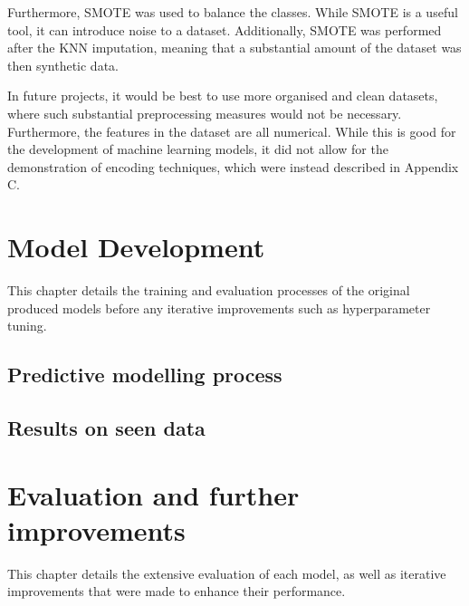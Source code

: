 \documentclass[12pt]{report}
\newcommand{\para}{\vspace{8pt}\noindent}
\begin{document}
\para Furthermore, SMOTE was used to balance the classes. While SMOTE is a useful tool, it can introduce noise to a dataset.
Additionally, SMOTE was performed after the KNN imputation, meaning that a substantial amount of the dataset was then synthetic data.

\para In future projects, it would be best to use more organised and clean datasets, where such substantial 
preprocessing measures would not be necessary. Furthermore, the features in the dataset are all numerical.
While this is good for the development of machine learning models, it did not allow for the demonstration 
of encoding techniques, which were instead described in Appendix C.

\chapter{Model Development} %
This chapter details the training and evaluation processes of the original produced models
before any iterative improvements such as hyperparameter tuning.


\section{Predictive modelling process}

\section{Results on seen data}


\chapter{Evaluation and further improvements}
This chapter details the extensive evaluation of each model, as well as iterative improvements 
that were made to enhance their performance.
\end{document}
